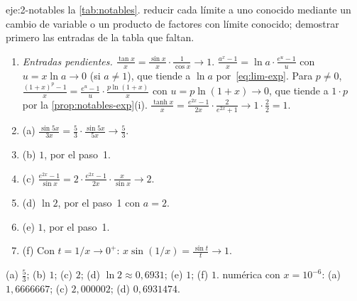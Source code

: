 \begin{solucion}{eje:2-notables}
\datos la \cref{tab:notables}.
\planteamiento reducir cada límite a uno conocido mediante un cambio de variable o un producto de factores con límite conocido; demostrar primero las entradas de la tabla que faltan.
\pasos
\begin{enumerate}[label=\arabic*.]
  \item \emph{Entradas pendientes.} $\frac{\tan x}{x}=\frac{\sin x}{x}\cdot\frac{1}{\cos x}\to1$. $\frac{a^{x}-1}{x}=\ln a\cdot\frac{e^{u}-1}{u}$ con $u=x\ln a\to0$ (si $a\ne1$), que tiende a $\ln a$ por~\eqref{eq:lim-exp}. Para $p\ne0$, $\frac{(1+x)^{p}-1}{x}=\frac{e^{u}-1}{u}\cdot\frac{p\ln(1+x)}{x}$ con $u=p\ln(1+x)\to0$, que tiende a $1\cdot p$ por la \cref{prop:notables-exp}(i). $\frac{\tanh x}{x}=\frac{e^{2x}-1}{2x}\cdot\frac{2}{e^{2x}+1}\to1\cdot\frac22=1$.
  \item (a) $\frac{\sin5x}{3x}=\frac53\cdot\frac{\sin5x}{5x}\to\frac53$.
  \item (b) $1$, por el paso~1.
  \item (c) $\frac{e^{2x}-1}{\sin x}=2\cdot\frac{e^{2x}-1}{2x}\cdot\frac{x}{\sin x}\to2$.
  \item (d) $\ln2$, por el paso~1 con $a=2$.
  \item (e) $1$, por el paso~1.
  \item (f) Con $t=1/x\to0^{+}$: $x\sin(1/x)=\frac{\sin t}{t}\to1$.
\end{enumerate}
\resultado (a) $\tfrac53$; (b) $1$; (c) $2$; (d) $\ln2\approx0{,}6931$; (e) $1$; (f) $1$.
\comprobacion numérica con $x=10^{-6}$: (a) $1{,}6666667$; (c) $2{,}000002$; (d) $0{,}6931474$.
\end{solucion}

